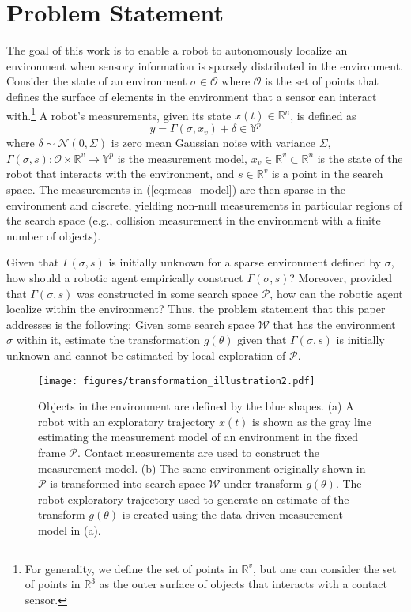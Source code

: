\documentclass[conference]{IEEEtran}
\begin{document}
\section{Problem Statement} 
\label{sec:problem-statement}
The goal of this work is to enable a robot to autonomously localize an environment when sensory information is sparsely distributed in the environment.
Consider the state of an environment $\sigma \in \mathcal{O}$ where $\mathcal{O}$ is the set of points that defines the surface of elements in the environment that a sensor can interact with.\footnote{For generality, we define the set of points in $\mathbb{R}^v$, but one can consider the set of points in $\mathbb{R}^3$ as the outer surface of objects that interacts with a contact sensor.}
A robot's measurements, given its state $x(t) \in \mathbb{R}^n$, is defined as
\begin{equation}\label{eq:meas_model}
y = \Gamma(\sigma, x_v) + \delta \in \mathbb{Y}^p
\end{equation}
where $\delta \sim \mathcal{N}(0, \Sigma)$ is zero mean Gaussian noise with variance $\Sigma$, $\Gamma(\sigma, s) : \mathcal{O} \times \mathbb{R}^v \to \mathbb{Y}^p$ is the measurement model, $x_v\in \mathbb{R}^v \subset \mathbb{R}^n$ is the state of the robot that interacts with the environment, and $s\in \mathbb{R}^v$ is a point in the search space.
The measurements in (\ref{eq:meas_model}) are then sparse in the environment and discrete, yielding non-null measurements in particular regions of the search space (e.g., collision measurement in the environment with a finite number of objects).
 
Given that $\Gamma(\sigma, s)$ is initially unknown for a sparse environment defined by $\sigma$, how should a robotic agent empirically construct $\Gamma(\sigma, s)$?
Moreover, provided that $\Gamma(\sigma, s)$ was constructed in some search space $\mathcal{P}$, how can the robotic agent localize within the environment?
Thus, the problem statement that this paper addresses is the following: Given some search space $\mathcal{W}$ that has the environment $\sigma$ within it, estimate the transformation $g(\theta)$ given that $\Gamma(\sigma, s)$ is initially unknown and cannot be estimated by local exploration of $\mathcal{P}$.

\begin{figure}[]
\centering
\texttt{[image: figures/transformation\_illustration2.pdf]} 
\caption{Objects in the environment are defined by the blue shapes. (a) A robot with an exploratory trajectory $x(t)$ is shown as the gray line estimating the measurement model of an environment in the fixed frame $\mathcal{P}$. Contact measurements are used to construct the measurement model. (b) The same environment originally shown in $\mathcal{P}$ is transformed into search space $\mathcal{W}$ under transform $g(\theta)$. The robot exploratory trajectory used to generate an estimate of the transform $g(\theta)$ is created using the data-driven measurement model in (a).}
\vspace{-5mm}
\label{fig:transf_illus}
\end{figure}
\end{document}
